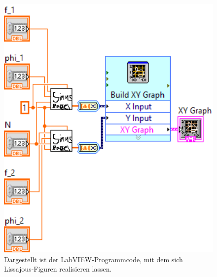 \documentclass[
a4paper,
12pt,
pagesize,
ngerman
]{scrartcl}
\begin{document}
	\begin{figure}[h]
		\centering
		\includegraphics[width=1.0\textwidth]{EIRE2018Dateien/Tag1/lissajous-bilder/Lissajousd}
		\caption{Dargestellt ist der LabVIEW-Programmcode, mit dem sich Lissajous-Figuren realisieren lassen.}
		\label{lissajouscode}
		\centering
	\end{figure}
\end{document}
